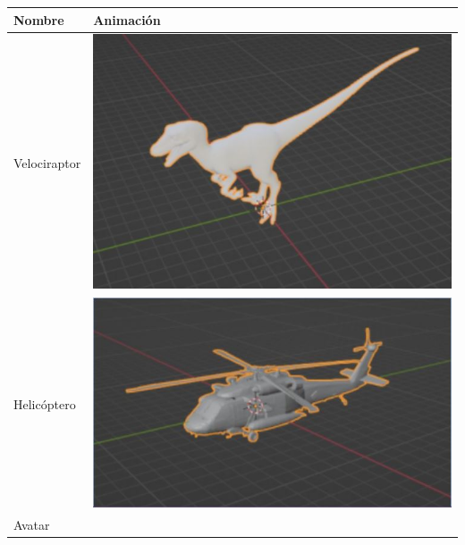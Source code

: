 \documentclass[12pt]{article} %
\begin{document}
	\begin{center}
		\begin{tabular}{ | m{19em} | m{19em} | }
			\hline
			\rowcolor[rgb]{0.6,0.8,1.0}
			\textbf{Nombre} & \textbf{Animación}  \\  
		 	\hline
		 	\hline
		 	\rowcolor[rgb]{0.4,0.6,1.0}
		 	Velociraptor &
		 	\includegraphics[scale=0.5]{images/Velociraptor.JPG} \\  
		 	\hline
		 	\rowcolor[rgb]{0.6,0.8,1.0}
		 	Helicóptero &
		 	\includegraphics[scale=0.5]{images/Helicoptero.JPG} \\  
			\hline
			\rowcolor[rgb]{0.4,0.6,1.0}
		 	Avatar &

\end{tabular}
\end{center}
\end{document}
